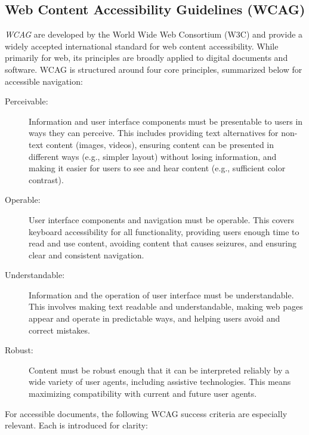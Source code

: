 \subsection{Web Content Accessibility Guidelines (WCAG)}
\label{subsec:wcag}
\emph{WCAG} \cite{WCAG} are developed by the World Wide Web Consortium (W3C) and provide a widely accepted international standard for web content accessibility. While primarily for web, its principles are broadly applied to digital documents and software. WCAG is structured around four core principles, summarized below for accessible navigation:
\begin{description}
    \item[Perceivable:] Information and user interface components must be presentable to users in ways they can perceive. This includes providing text alternatives for non-text content (images, videos), ensuring content can be presented in different ways (e.g., simpler layout) without losing information, and making it easier for users to see and hear content (e.g., sufficient color contrast).
    \item[Operable:] User interface components and navigation must be operable. This covers keyboard accessibility for all functionality, providing users enough time to read and use content, avoiding content that causes seizures, and ensuring clear and consistent navigation.
    \item[Understandable:] Information and the operation of user interface must be understandable. This involves making text readable and understandable, making web pages appear and operate in predictable ways, and helping users avoid and correct mistakes.
    \item[Robust:] Content must be robust enough that it can be interpreted reliably by a wide variety of user agents, including assistive technologies. This means maximizing compatibility with current and future user agents.
\end{description}
For accessible documents, the following WCAG success criteria are especially relevant. Each is introduced for clarity:
